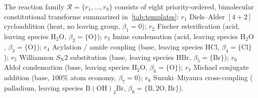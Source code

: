 \documentclass[11pt,a4paper]{article}
\theoremstyle{plain}
\theoremstyle{definition}
\theoremstyle{remark}
\newcommand{\Reacts}{\mathcal{R}}
\newcommand{\SNtwo}{S_{\mathrm{N}}2}
\newcommand{\mset}[1]{\lbrace#1\rbrace}
\newcommand{\chem}[1]{\ensuremath{\mathrm{#1}}}
\begin{document}
\begin{definition}\label{def:reaction-set}
  The reaction family \( \Reacts = \{r_1, \dots, r_8\} \) consists of eight priority-ordered,
  bimolecular constitutional transforms summarized in~\cref{tab:templates}:
  \( r_1 \) Diels--Alder \([4 + 2]\) cycloaddition (\(\text{heat}\), no leaving group,
  \( \beta_1 = 0 \));
  \( r_2 \) Fischer esterification (\(\text{acid}\), leaving species \chem{H_2O},
  \( \beta_2 = \mset{\mathrm{O}} \));
  \( r_3 \) Imine condensation (\(\text{acid}\), leaving species \chem{H_2O},
  \( \beta_3 = \mset{\mathrm{O}} \));
  \( r_4 \) Acylation / amide coupling (\(\text{base}\), leaving species \chem{HCl},
  \( \beta_4 = \mset{\mathrm{Cl}} \));
  \( r_5 \) Williamson \( \SNtwo \) substitution (\(\text{base}\), leaving species \chem{HBr},
  \( \beta_5 = \mset{\mathrm{Br}} \));
  \( r_6 \) Aldol condensation (\(\text{base}\), leaving species \chem{H_2O},
  \( \beta_6 = \mset{\mathrm{O}} \));
  \( r_7 \) Michael conjugate addition (\(\text{base}\), 100\% atom economy, \( \beta_7 = 0 \));
  \( r_8 \) Suzuki--Miyaura cross-coupling (\(\text{palladium}\), leaving species
  \chem{B(OH)_2Br}, \( \beta_8 = \mset{\mathrm{B}, 2\mathrm{O}, \mathrm{Br}} \)).
\end{definition}
\end{document}
